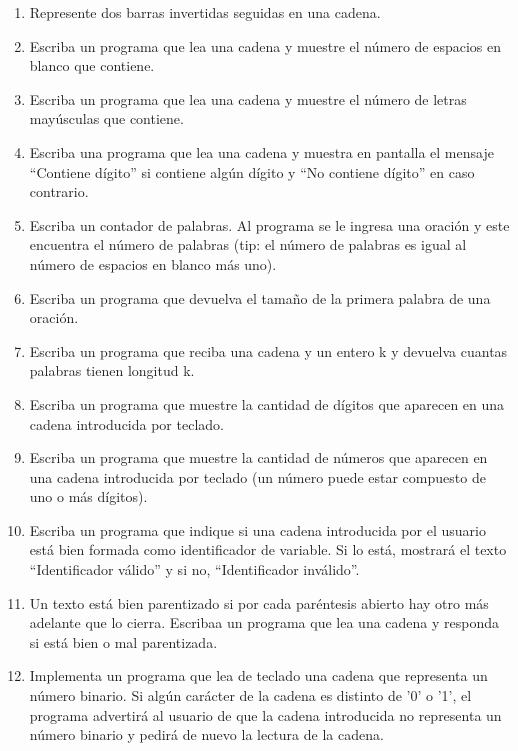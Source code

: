 \begin{enumerate}
\item Represente dos barras invertidas seguidas en una cadena.

\item Escriba un programa que lea una cadena y muestre el número de espacios en blanco que contiene.

\item Escriba un programa que lea una cadena y muestre el número de letras mayúsculas que contiene.

\item Escriba una programa que lea una cadena y muestra en pantalla el mensaje ``Contiene dígito'' si contiene algún dígito y ``No contiene dígito'' en caso contrario.

\item Escriba un contador de palabras. Al programa se le ingresa una oración y este encuentra el número de palabras (tip: el número de palabras es igual al número de espacios en blanco más uno).

\item Escriba un programa que devuelva el tamaño de la primera palabra de una oración.

\item Escriba un programa que reciba una cadena y un entero k y devuelva cuantas palabras tienen longitud k.

\item Escriba un programa que muestre la cantidad de dígitos que aparecen en una cadena introducida por teclado. 

\item Escriba un programa que muestre la cantidad de números que aparecen en una cadena introducida por teclado (un número puede estar compuesto de uno o más dígitos). 

\item Escriba un programa que indique si una cadena introducida por el usuario está bien formada como identificador de variable. Si lo está, mostrará el texto ``Identificador válido'' y si no, ``Identificador inválido''.

\item Un texto está bien parentizado si por cada paréntesis abierto hay otro más adelante que lo cierra. Escribaa un programa que lea una cadena y responda si está bien o mal parentizada.

\item Implementa un programa que lea de teclado una cadena que representa un número binario. Si algún carácter de la cadena es distinto de '0' o '1', el programa advertirá al usuario de que la cadena introducida no representa un número binario y pedirá de nuevo la lectura de la cadena.


\end{enumerate}
